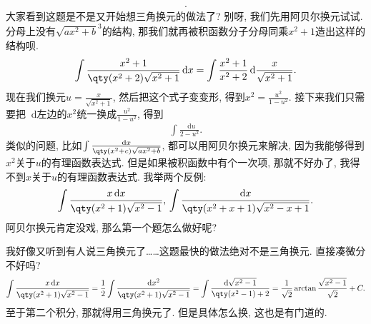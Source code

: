 \documentclass{ctexbook}
\newcommand*{\dif}{\mathop{}\!\mathrm{d}}
\begin{document}
{\begin{align*}
.\end{align*}
大家看到这题是不是又开始想三角换元的做法了? 别呀, 我们先用阿贝尔换元试试. 分母上没有$\sqrt{ax^{2}+b}^{3}$的结构, 那我们就再被积函数分子分母同乘$x^{2}+1$造出这样的结构呗. 
\begin{align*}
\int\frac{x^{2}+1}{\qty(x^{2}+2)\sqrt{x^{2}+1}}\dif{x}=\int\frac{x^{2}+1}{x^{2}+2}\dif{\frac{x}{\sqrt{x^{2}+1}}}
.\end{align*}
现在我们换元$u=\frac{x}{\sqrt{x^{2}+1}}$, 然后把这个式子变变形, 得到$x^{2}=\frac{u^{2}}{1-u^{2}}$. 接下来我们只需要把$\dif$左边的$x^{2}$统一换成$\frac{u^{2}}{1-u^{2}}$, 得到
\begin{align*}
\int\frac{\dif{u}}{2-u^{2}}
.\end{align*}
类似的问题, 比如$\int\frac{\dif{x}}{\qty(x^{2}+c)\sqrt{ax^{2}+b}}$, 都可以用阿贝尔换元来解决, 因为我能够得到$x^{2}$关于$u$的有理函数表达式. 但是如果被积函数中有个一次项, 那就不好办了, 我得不到$x$关于$u$的有理函数表达式. 我举两个反例: 
\begin{align*}
\int\frac{x\dif{x}}{\qty(x^{2}+1)\sqrt{x^{2}-1}},\,\int\frac{\dif{x}}{\qty(x^{2}+x+1)\sqrt{x^{2}-x+1}}
.\end{align*}
阿贝尔换元肯定没戏, 那么第一个题怎么做好呢? \par
我好像又听到有人说三角换元了……这题最快的做法绝对不是三角换元. 直接凑微分不好吗? 
\begin{align*}
\int\frac{x\dif{x}}{\qty(x^{2}+1)\sqrt{x^{2}-1}}=\frac{1}{2}\int\frac{\dif{x^{2}}}{\qty(x^{2}+1)\sqrt{x^{2}-1}}=\int\frac{\dif{\sqrt{x^{2}-1}}}{\qty(x^{2}-1)+2}=\frac{1}{\sqrt{2}}\arctan{\frac{\sqrt{x^{2}-1}}{\sqrt{2}}}+C
.\end{align*}
至于第二个积分, 那就得用三角换元了. 但是具体怎么换, 这也是有门道的. \par
}
\end{document}
